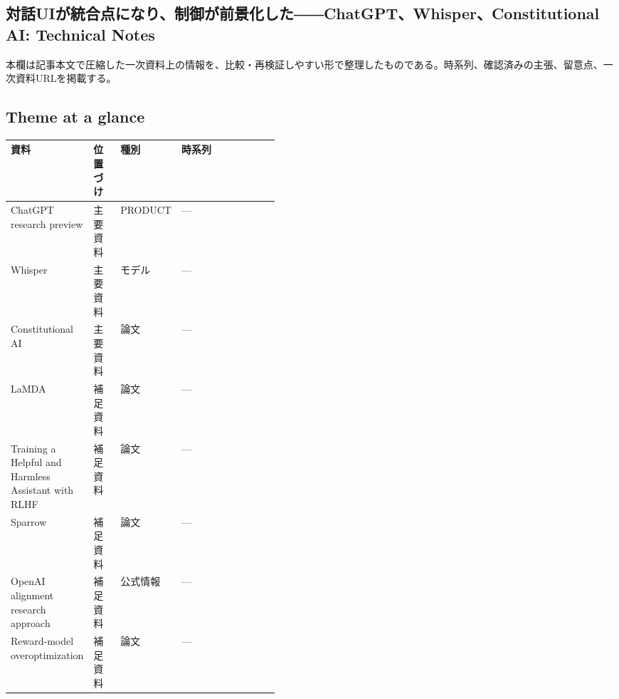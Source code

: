 \subsection*{対話UIが統合点になり、制御が前景化した――ChatGPT、Whisper、Constitutional AI: Technical Notes}
本欄は記事本文で圧縮した一次資料上の情報を、比較・再検証しやすい形で整理したものである。時系列、確認済みの主張、留意点、一次資料URLを掲載する。
\smallskip
{}\par
\medskip
\subsection*{Theme at a glance}
\begin{center}
\footnotesize
\begin{tabularx}{\linewidth}{@{}p{0.20\linewidth}p{0.10\linewidth}p{0.14\linewidth}X@{}}
\toprule
資料 & 位置づけ & 種別 & 時系列 \\
\midrule
ChatGPT research preview & 主要資料 & PRODUCT & — \\
Whisper & 主要資料 & モデル & — \\
Constitutional AI & 主要資料 & 論文 & — \\
LaMDA & 補足資料 & 論文 & — \\
Training a Helpful and Harmless Assistant with RLHF & 補足資料 & 論文 & — \\
Sparrow & 補足資料 & 論文 & — \\
OpenAI alignment research approach & 補足資料 & 公式情報 & — \\
Reward-model overoptimization & 補足資料 & 論文 & — \\
\bottomrule
\end{tabularx}
\end{center}
\normalsize

